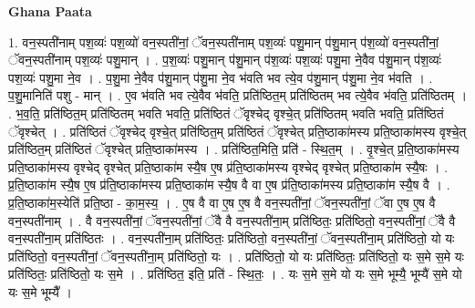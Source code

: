 \documentclass[17pt]{extarticle}
\begin{document}
\textbf{Ghana Paata } \newline

1. वन॒स्पती॑नाम् पश॒व्यः॑ पश॒व्यो॑ वन॒स्पती॑नां॒ ॅवन॒स्पती॑नाम् पश॒व्यः॑ पशु॒मान् प॑शु॒मान् प॑श॒व्यो॑ वन॒स्पती॑नां॒ ॅवन॒स्पती॑नाम् पश॒व्यः॑ पशु॒मान् । . प॒श॒व्यः॑ पशु॒मान् प॑शु॒मान् प॑श॒व्यः॑ पश॒व्यः॑ पशु॒मा ने॒वैव प॑शु॒मान् प॑श॒व्यः॑ पश॒व्यः॑ पशु॒मा ने॒व । . प॒शु॒मा ने॒वैव प॑शु॒मान् प॑शु॒मा ने॒व भ॑वति भव त्ये॒व प॑शु॒मान् प॑शु॒मा ने॒व भ॑वति । . प॒शु॒मानिति॑ पशु - मान् । . ए॒व भ॑वति भव त्ये॒वैव भ॑वति॒ प्रति॑ष्ठित॒म् प्रति॑ष्ठितम् भव त्ये॒वैव भ॑वति॒ प्रति॑ष्ठितम् । . भ॒व॒ति॒ प्रति॑ष्ठित॒म् प्रति॑ष्ठितम् भवति भवति॒ प्रति॑ष्ठितं ॅवृश्चेद् वृश्चे॒त् प्रति॑ष्ठितम् भवति भवति॒ प्रति॑ष्ठितं ॅवृश्चेत् । . प्रति॑ष्ठितं ॅवृश्चेद् वृश्चे॒त् प्रति॑ष्ठित॒म् प्रति॑ष्ठितं ॅवृश्चेत् प्रति॒ष्ठाका॑मस्य प्रति॒ष्ठाका॑मस्य वृश्चे॒त् प्रति॑ष्ठित॒म् प्रति॑ष्ठितं ॅवृश्चेत् प्रति॒ष्ठाका॑मस्य । . प्रति॑ष्ठित॒मिति॒ प्रति॑ - स्थि॒त॒म् । . वृ॒श्चे॒त् प्र॒ति॒ष्ठाका॑मस्य प्रति॒ष्ठाका॑मस्य वृश्चेद् वृश्चेत् प्रति॒ष्ठाका॑म स्यै॒ष ए॒ष प्र॑ति॒ष्ठाका॑मस्य वृश्चेद् वृश्चेत् प्रति॒ष्ठाका॑म स्यै॒षः । . प्र॒ति॒ष्ठाका॑म स्यै॒ष ए॒ष प्र॑ति॒ष्ठाका॑मस्य प्रति॒ष्ठाका॑म स्यै॒ष वै वा ए॒ष प्र॑ति॒ष्ठाका॑मस्य प्रति॒ष्ठाका॑म स्यै॒ष वै । . प्र॒ति॒ष्ठाका॑म॒स्येति॑ प्रति॒ष्ठा - का॒म॒स्य॒ । . ए॒ष वै वा ए॒ष ए॒ष वै वन॒स्पती॑नां॒ ॅवन॒स्पती॑नां॒ ॅवा ए॒ष ए॒ष वै वन॒स्पती॑नाम् । . वै वन॒स्पती॑नां॒ ॅवन॒स्पती॑नां॒ ॅवै वै वन॒स्पती॑ना॒म् प्रति॑ष्ठितः॒ प्रति॑ष्ठितो॒ वन॒स्पती॑नां॒ ॅवै वै वन॒स्पती॑ना॒म् प्रति॑ष्ठितः । . वन॒स्पती॑ना॒म् प्रति॑ष्ठितः॒ प्रति॑ष्ठितो॒ वन॒स्पती॑नां॒ ॅवन॒स्पती॑ना॒म् प्रति॑ष्ठितो॒ यो यः प्रति॑ष्ठितो॒ वन॒स्पती॑नां॒ ॅवन॒स्पती॑ना॒म् प्रति॑ष्ठितो॒ यः । . प्रति॑ष्ठितो॒ यो यः प्रति॑ष्ठितः॒ प्रति॑ष्ठितो॒ यः स॒मे स॒मे यः प्रति॑ष्ठितः॒ प्रति॑ष्ठितो॒ यः स॒मे । . प्रति॑ष्ठित॒ इति॒ प्रति॑ - स्थि॒तः॒ । . यः स॒मे स॒मे यो यः स॒मे भूम्यै॒ भूम्यै॑ स॒मे यो यः स॒मे भूम्यै᳚ । \newline
\end{document}
